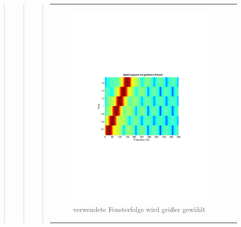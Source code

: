 \begin{quote}
\begin{quote}
\begin{quote}
\begin{center}
\begin{tabular}{ll}
\begin{minipage}{0.6\textwidth}
                        \begin{figure}[H]
                            \label{fig:}
                            \includegraphics[scale=0.63, trim = 3cm 9cm 3cm
                            9cm,
                            clip]{./Bilder/Termin7/bsp_chirp_spectrogram_grossesFenster}
                            \caption{verwendete Fensterfolge wird größer
                            gewählt}
                        \end{figure}
                    \vspace{-1.5em}
    
                    \end{minipage}
    
                \end{tabular}
                \end{center}
                

\end{quote}
\end{quote}
\end{quote}
